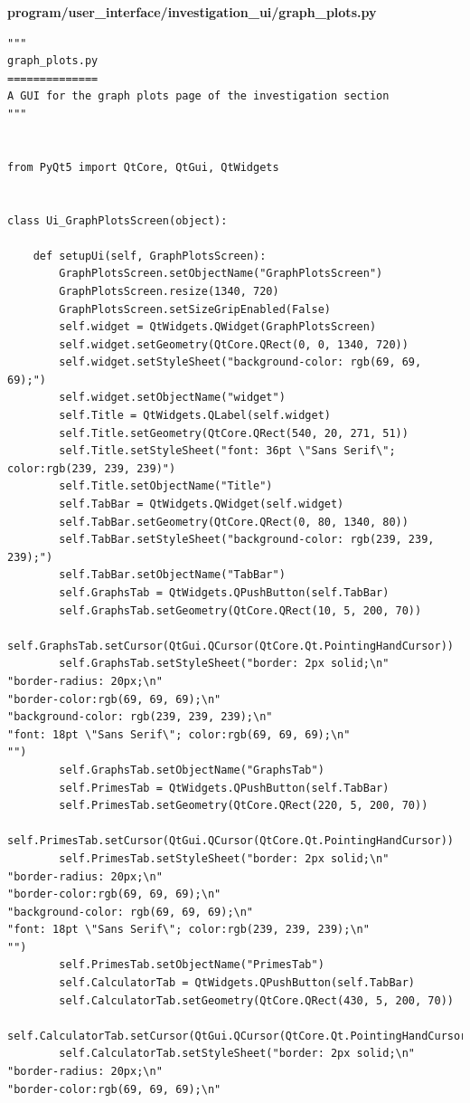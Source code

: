 \documentclass[12pt]{article}
\begin{document}
\textbf{program/user\_interface/investigation\_ui/graph\_plots.py}
\begin{lstlisting}
"""
graph_plots.py
==============
A GUI for the graph plots page of the investigation section
"""


from PyQt5 import QtCore, QtGui, QtWidgets


class Ui_GraphPlotsScreen(object):

    def setupUi(self, GraphPlotsScreen):
        GraphPlotsScreen.setObjectName("GraphPlotsScreen")
        GraphPlotsScreen.resize(1340, 720)
        GraphPlotsScreen.setSizeGripEnabled(False)
        self.widget = QtWidgets.QWidget(GraphPlotsScreen)
        self.widget.setGeometry(QtCore.QRect(0, 0, 1340, 720))
        self.widget.setStyleSheet("background-color: rgb(69, 69, 69);")
        self.widget.setObjectName("widget")
        self.Title = QtWidgets.QLabel(self.widget)
        self.Title.setGeometry(QtCore.QRect(540, 20, 271, 51))
        self.Title.setStyleSheet("font: 36pt \"Sans Serif\"; color:rgb(239, 239, 239)")
        self.Title.setObjectName("Title")
        self.TabBar = QtWidgets.QWidget(self.widget)
        self.TabBar.setGeometry(QtCore.QRect(0, 80, 1340, 80))
        self.TabBar.setStyleSheet("background-color: rgb(239, 239, 239);")
        self.TabBar.setObjectName("TabBar")
        self.GraphsTab = QtWidgets.QPushButton(self.TabBar)
        self.GraphsTab.setGeometry(QtCore.QRect(10, 5, 200, 70))
        self.GraphsTab.setCursor(QtGui.QCursor(QtCore.Qt.PointingHandCursor))
        self.GraphsTab.setStyleSheet("border: 2px solid;\n"
"border-radius: 20px;\n"
"border-color:rgb(69, 69, 69);\n"
"background-color: rgb(239, 239, 239);\n"
"font: 18pt \"Sans Serif\"; color:rgb(69, 69, 69);\n"
"")
        self.GraphsTab.setObjectName("GraphsTab")
        self.PrimesTab = QtWidgets.QPushButton(self.TabBar)
        self.PrimesTab.setGeometry(QtCore.QRect(220, 5, 200, 70))
        self.PrimesTab.setCursor(QtGui.QCursor(QtCore.Qt.PointingHandCursor))
        self.PrimesTab.setStyleSheet("border: 2px solid;\n"
"border-radius: 20px;\n"
"border-color:rgb(69, 69, 69);\n"
"background-color: rgb(69, 69, 69);\n"
"font: 18pt \"Sans Serif\"; color:rgb(239, 239, 239);\n"
"")
        self.PrimesTab.setObjectName("PrimesTab")
        self.CalculatorTab = QtWidgets.QPushButton(self.TabBar)
        self.CalculatorTab.setGeometry(QtCore.QRect(430, 5, 200, 70))
        self.CalculatorTab.setCursor(QtGui.QCursor(QtCore.Qt.PointingHandCursor))
        self.CalculatorTab.setStyleSheet("border: 2px solid;\n"
"border-radius: 20px;\n"
"border-color:rgb(69, 69, 69);\n"

\end{lstlisting}
\end{document}
